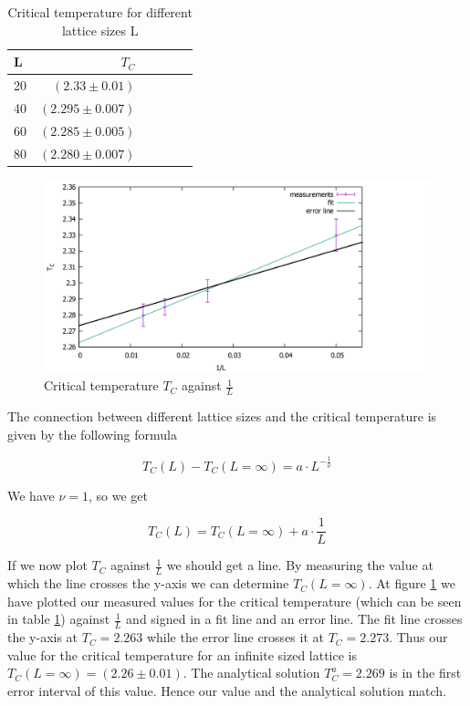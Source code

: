 \documentclass[10pt,a4paper]{article}
\begin{document}
\begin{table}[h!]
	\centering
	\begin{tabular}{|l|r|c|lrp{16cm}}\hline
		L & $T_C$ \\\hline
		20 & $(2.33 \pm 0.01)$\\
		40 & $(2.295 \pm 0.007)$\\
		60 & $(2.285 \pm 0.005)$\\
		80 & $(2.280 \pm 0.007)$\\\hline
	\end{tabular}
	\caption{Critical temperature for different lattice sizes L }
	\label{tc}
\end{table}

\begin{figure}[h]
	\includegraphics[scale = 0.25]{tc2.png}
	\centering
	\caption{Critical temperature $T_C$ against $\frac{1}{L}$}
	\label{tc2}
\end{figure}



The connection between different lattice sizes and the critical temperature is given by the following formula

\begin{equation}
T_C(L) - T_C(L = \infty) = a \cdot L^{-\frac{1}{\nu}}
\end{equation}

We have $\nu = 1$, so we get

\begin{equation}
T_C(L) = T_C(L = \infty) + a \cdot \frac{1}{L}
\end{equation}

If we now plot $T_C$ against $\frac{1}{L}$ we should get a line. By measuring the value at which the line crosses the y-axis we can determine $T_C(L = \infty)$. At figure \ref*{tc2} we have plotted our measured values for the critical temperature (which can be seen in table \ref*{tc}) against $\frac{1}{L}$ and signed in a fit line and an error line. The fit line crosses the y-axis at $T_C = 2.263$ while the error line crosses it at $T_C = 2.273$. Thus our value for the critical temperature for an infinite sized lattice is $T_C(L = \infty) = (2.26 \pm 0.01)$. The analytical solution $T_C^{a} = 2.269$ is in the first error interval of this value. Hence our value and the analytical solution match.
\end{document}
